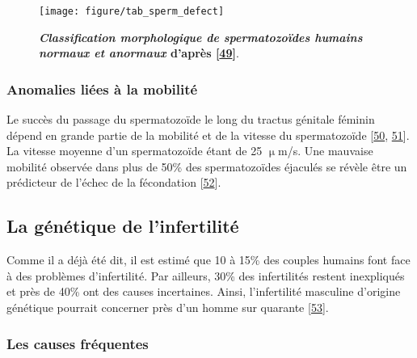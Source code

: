 \documentclass[12pt,a4paper,twoside]{ugathesis}
\theoremstyle{definition}
\theoremstyle{definition}
\theoremstyle{definition}
\theoremstyle{remark}
\begin{document}
\newpage  

\begin{figure}

{\centering \texttt{[image: figure/tab\_sperm\_defect]} 

}

\caption[Classification morphologique de spermatozoïdes humains normaux et anormaux]{\textbf{\emph{Classification morphologique de
spermatozoïdes humains normaux et anormaux} d'après
{[}\protect\hyperlink{ref-Auger2001}{49}{]}}.}\label{fig:anomaliemorphosperm}
\end{figure}





\newpage

\subsubsection{Anomalies liées à la
mobilité}\label{anomalies-liees-a-la-mobilite}

Le succès du passage du spermatozoïde le long du tractus génitale
féminin dépend en grande partie de la mobilité et de la vitesse du
spermatozoïde {[}\protect\hyperlink{ref-Lindholmer1974}{50},
\protect\hyperlink{ref-Bjorndahl2010}{51}{]}. La vitesse moyenne d'un
spermatozoïde étant de 25 \(\upmu\)m/s. Une mauvaise mobilité observée
dans plus de 50\% des spermatozoïdes éjaculés se révèle être un
prédicteur de l'échec de la fécondation
{[}\protect\hyperlink{ref-Aitken1985}{52}{]}.

\subsection{La génétique de
l'infertilité}\label{la-genetique-de-linfertilite}

Comme il a déjà été dit, il est estimé que 10 à 15\% des couples humains
font face à des problèmes d'infertilité. Par ailleurs, 30\% des
infertilités restent inexpliqués et près de 40\% ont des causes
incertaines. Ainsi, l'infertilité masculine d'origine génétique pourrait
concerner près d'un homme sur quarante
{[}\protect\hyperlink{ref-Tuttelmann2011}{53}{]}.

\subsubsection{Les causes fréquentes}\label{les-causes-frequentes}
\end{document}
